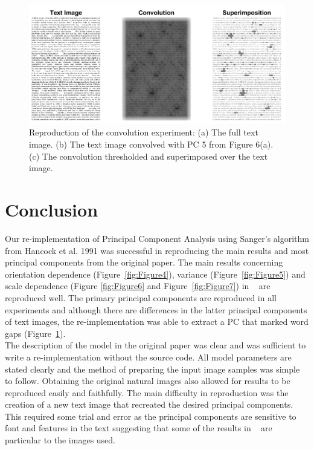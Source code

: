 \begin{figure}
    \centering
    \includegraphics[scale=0.55]{figures/Figure8.png}
    \caption{Reproduction of the convolution experiment: (a) The full text image. (b) The text image convolved with PC 5 from Figure 6(a). (c) The convolution thresholded and superimposed over the text image.}
    \label{fig:Figure8}
\end{figure}

\section{Conclusion}
Our re-implementation of Principal Component Analysis using Sanger's algorithm from Hancock et al. 1991 was successful in reproducing the main results and most principal components from the original paper. The main results concerning orientation dependence (Figure~\ref{fig:Figure4}), variance (Figure~\ref{fig:Figure5}) and scale dependence (Figure \ref{fig:Figure6} and Figure~\ref{fig:Figure7}) in ~\cite{Hancock} are reproduced well. The primary principal components are reproduced in all experiments and although there are differences in the latter principal components of text images, the re-implementation was able to extract a PC that marked word gaps (Figure~\ref{fig:Figure8}).\\
The description of the model in the original paper was clear and was sufficient to write a re-implementation without the source code. All model parameters are stated clearly and the method of preparing the input image samples was simple to follow. Obtaining the original natural images also allowed for results to be reproduced easily and faithfully. The main difficulty in reproduction was the creation of a new text image that recreated the desired principal components. This required some trial and error as the principal components are sensitive to font and features in the text suggesting that some of the results in ~\cite{Hancock} are particular to the images used.
